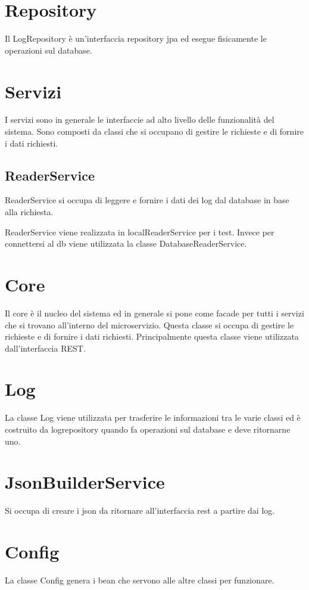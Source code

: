 \section{Repository}
Il LogRepository è un'interfaccia repository jpa ed esegue fisicamente le operazioni sul database.

\section{Servizi}

I servizi sono in generale le interfaccie ad alto livello delle funzionalità del sistema. Sono composti da classi che si occupano di gestire le richieste e di fornire i dati richiesti.

\subsection{ReaderService}
ReaderService si occupa di leggere e fornire i dati dei log dal database in base alla richiesta.

ReaderService viene realizzata in localReaderService per i test. Invece per connettersi al db viene utilizzata la classe DatabaseReaderService.

\section{Core}
Il core è il nucleo del sistema ed in generale si pone come facade per tutti i servizi che si trovano all'interno del microservizio. Questa classe si occupa di gestire le richieste e di fornire i dati richiesti.
Principalmente questa classe viene utilizzata dall'interfaccia REST.

\section{Log}
La classe Log viene utilizzata per trasferire le informazioni tra le varie classi ed è costruito da logrepository quando fa operazioni sul database e deve ritornarne uno.

\section{JsonBuilderService}
Si occupa di creare i json da ritornare all'interfaccia rest a partire dai log.

\section{ Config}
La classe Config genera i bean che servono alle altre classi per funzionare.



